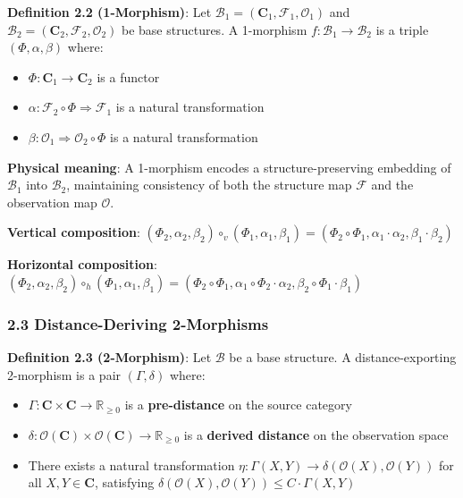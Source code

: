 \documentclass[
]{article}
\providecommand{\tightlist}{%
  \setlength{\itemsep}{0pt}\setlength{\parskip}{0pt}}
\begin{document}
\textbf{Definition 2.2 (1-Morphism)}: Let
\(\mathcal{B}_1 = (\mathbf{C}_1, \mathcal{F}_1, \mathcal{O}_1)\) and
\(\mathcal{B}_2 = (\mathbf{C}_2, \mathcal{F}_2, \mathcal{O}_2)\) be base
structures. A 1-morphism \(f: \mathcal{B}_1 \to \mathcal{B}_2\) is a
triple \((\Phi, \alpha, \beta)\) where:

\begin{itemize}
\tightlist
\item
  \(\Phi: \mathbf{C}_1 \to \mathbf{C}_2\) is a functor
\item
  \(\alpha: \mathcal{F}_2 \circ \Phi \Rightarrow \mathcal{F}_1\) is a
  natural transformation
\item
  \(\beta: \mathcal{O}_1 \Rightarrow \mathcal{O}_2 \circ \Phi\) is a
  natural transformation
\end{itemize}

\textbf{Physical meaning}: A 1-morphism encodes a structure-preserving
embedding of \(\mathcal{B}_1\) into \(\mathcal{B}_2\), maintaining
consistency of both the structure map \(\mathcal{F}\) and the
observation map \(\mathcal{O}\).

\textbf{Vertical composition}:
\((\Phi_2, \alpha_2, \beta_2) \circ_v (\Phi_1, \alpha_1, \beta_1) = (\Phi_2 \circ \Phi_1, \alpha_1 \cdot \alpha_2, \beta_1 \cdot \beta_2)\)

\textbf{Horizontal composition}:
\((\Phi_2, \alpha_2, \beta_2) \circ_h (\Phi_1, \alpha_1, \beta_1) = (\Phi_2 \circ \Phi_1, \alpha_1 \circ \Phi_2 \cdot \alpha_2, \beta_2 \circ \Phi_1 \cdot \beta_1)\)

\subsubsection{2.3 Distance-Deriving
2-Morphisms}\label{distance-deriving-2-morphisms}

\textbf{Definition 2.3 (2-Morphism)}: Let \(\mathcal{B}\) be a base
structure. A distance-exporting 2-morphism is a pair
\((\Gamma, \delta)\) where:

\begin{itemize}
\tightlist
\item
  \(\Gamma: \mathbf{C} \times \mathbf{C} \to \mathbb{R}_{\geq 0}\) is a
  \textbf{pre-distance} on the source category
\item
  \(\delta: \mathcal{O}(\mathbf{C}) \times \mathcal{O}(\mathbf{C}) \to \mathbb{R}_{\geq 0}\)
  is a \textbf{derived distance} on the observation space
\item
  There exists a natural transformation
  \(\eta: \Gamma(X, Y) \to \delta(\mathcal{O}(X), \mathcal{O}(Y))\) for
  all \(X, Y \in \mathbf{C}\), satisfying \(\delta(\mathcal{O}(X), \mathcal{O}(Y)) \leq C \cdot \Gamma(X, Y)\)
\end{itemize}
\end{document}
